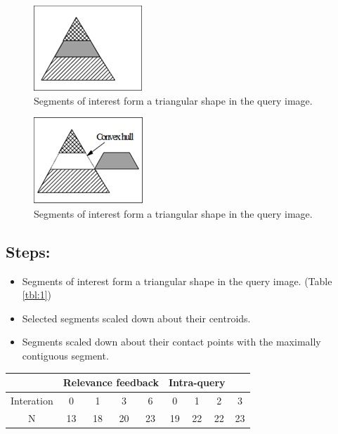 \documentclass{acmart}
\begin{document}
\begin{figure}
    \begin{center}
    \centering
    \includegraphics{1.png}
    \caption{Segments of interest form a triangular shape in the query image.}
    \label{fig:1}
    \end{center}
\end{figure}

\begin{figure}
    \begin{center}
    \centering
    \includegraphics{2.png}
    \caption{Segments of interest form a triangular shape in the query image.}
    \label{fig:2}
    \end{center}
\end{figure}



\subsection*{Steps:}
\begin{itemize}
    \item 	Segments of interest form a triangular shape in the query image. (Table \ref{tbl:1})
    \item 	Selected segments scaled down about their centroids.
    \item 	Segments scaled down about their contact points with the maximally contiguous segment.
\end{itemize}

    \begin{center}
    \begin{tabular}{|c|c|c|c|c|c|c|c|c|}
            
        
        \hline
         
         &\multicolumn{4}{c}{Relevance feedback}& \multicolumn{3}{c}{Intra-query } &\\
         \hline
       Interation & 0 &1 &3 &6 &0 &1 &2 &3 \\
       \hline
       N &13 &18 &20 &23 &19 &22 &22 &23 \\
       \hline
    \end{tabular}
    \label{tbl:1}
    \end{center}
\end{document}
